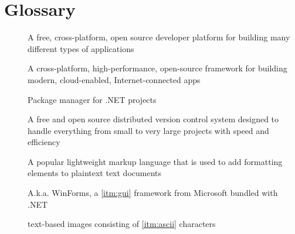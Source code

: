 \chapter*{Glossary}

\begin{description}
    \item [] A free, cross-platform, open source developer platform for building many different types of applications \cite{microsoft_what_2022}
    \item [] A cross-platform, high-performance, open-source framework for building modern, cloud-enabled, Internet-connected apps \cite{rick-anderson_overview_2022}
    \item [] Package manager for .NET projects \cite{microsoft_nuget_2022}
    \item [] A free and open source distributed version control system designed to handle everything from small to very large projects with speed and efficiency \cite{git_git_2022}
    \item [] A popular lightweight markup language that is used to add formatting elements to plaintext text documents \cite{cone_getting_2022}
    \item [] A.k.a. WinForms, a \ref{itm:gui} framework from Microsoft bundled with .NET
    \item [] text-based images consisting of \ref{itm:ascii} characters
\end{description}